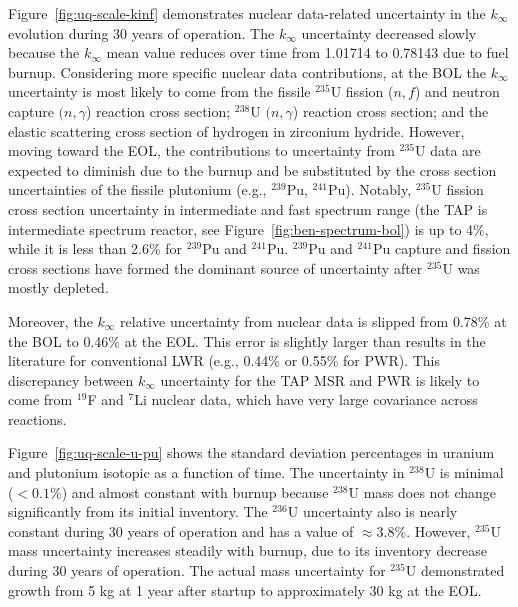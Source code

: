 Figure~\ref{fig:uq-scale-kinf} demonstrates nuclear data-related uncertainty 
in the $k_{\infty}$ evolution during 30 years of operation. The $k_{\infty}$  
uncertainty decreased slowly because the $k_{\infty}$ mean value reduces over 
time from 1.01714 to 0.78143 due to fuel burnup. Considering more specific 
nuclear data contributions, at the \gls{BOL} the $k_{\infty}$ uncertainty is 
most likely to come from the fissile $^{235}$U fission ($n,f$) and neutron 
capture $(n,\gamma$) reaction cross section; $^{238}$U $(n,\gamma$) reaction 
cross section; and the elastic scattering cross section of hydrogen in 
zirconium hydride. However, moving toward the \gls{EOL}, the contributions to 
uncertainty from $^{235}$U data are expected to diminish due to the burnup and 
be substituted by the cross section uncertainties of the fissile plutonium 
(e.g., $^{239}$Pu, $^{241}$Pu). Notably, $^{235}$U fission cross section 
uncertainty in intermediate and fast spectrum range (the \gls{TAP} is 
intermediate spectrum reactor, see Figure~\ref{fig:ben-spectrum-bol}) is up to 
4\%, while it is less than 2.6\% for $^{239}$Pu and $^{241}$Pu. $^{239}$Pu and 
$^{241}$Pu capture and fission cross sections  have formed the 
dominant source of uncertainty after $^{235}$U was mostly depleted. 

Moreover, the $k_{\infty}$ relative uncertainty from
nuclear data is slipped 
from 0.78\% at the \gls{BOL} to 0.46\% at the \gls{EOL}. This error is 
slightly larger than results in the literature for conventional \gls{LWR} 
(e.g., 0.44\% \cite{williams_statistical_2013} or 0.55\% 
\cite{campolina_uncertainty_2018} for \gls{PWR}). This discrepancy between 
$k_{\infty}$ uncertainty for the \gls{TAP} \gls{MSR} and \gls{PWR} is likely 
to come from $^{19}$F and $^{7}$Li nuclear data, which have very large 
covariance across reactions.

Figure~\ref{fig:uq-scale-u-pu} shows the standard deviation percentages in 
uranium and plutonium isotopic as a function of time. The uncertainty in 
$^{238}$U is minimal ($<0.1$\%) and almost constant with burnup because 
$^{238}$U mass does not change significantly from its initial inventory. The 
$^{236}$U uncertainty also is nearly constant during 30 years of operation and 
has a value of $\approx3.8$\%. However, $^{235}$U mass uncertainty increases 
steadily with burnup, due to its inventory decrease during 30 years of 
operation. 
The actual mass uncertainty for $^{235}$U demonstrated growth from 5 kg at 1 
year after startup to approximately 30 kg at the \gls{EOL}.

